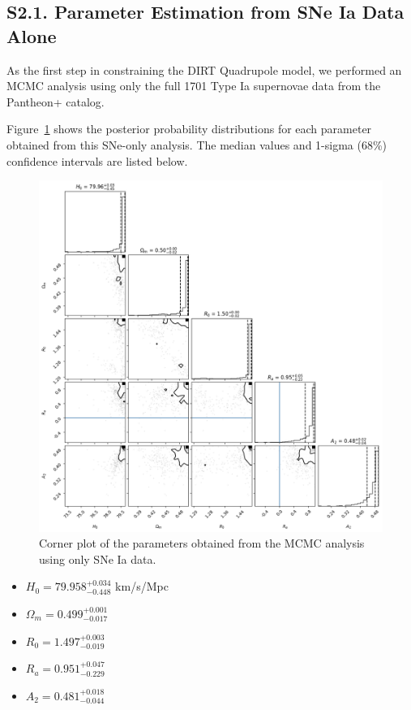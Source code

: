 \documentclass[a4paper,12pt]{article}
\begin{document}
\subsection*{S2.1. Parameter Estimation from SNe Ia Data Alone}
\label{subsec:supp_sne_only_fit}

As the first step in constraining the DIRT Quadrupole model, we performed an MCMC analysis using only the full 1701 Type Ia supernovae data from the Pantheon+ catalog.

Figure~\ref{fig:supp_mcmc_sne_only} shows the posterior probability distributions for each parameter obtained from this SNe-only analysis. The median values and 1-sigma (68\%) confidence intervals are listed below.

\begin{figure}[H]
    \centering
    \includegraphics[width=\linewidth]{S2_MCMC_analysis_of_SNe_Ia_alone.png}
    \caption{Corner plot of the parameters obtained from the MCMC analysis using only SNe Ia data.}
    \label{fig:supp_mcmc_sne_only}
\end{figure}

\begin{itemize}
    \item $H_0 = 79.958 ^{+0.034} _{-0.448}$ km/s/Mpc
    \item $\Omega_m = 0.499 ^{+0.001} _{-0.017}$
    \item $R_0 = 1.497 ^{+0.003} _{-0.019}$
    \item $R_a = 0.951 ^{+0.047} _{-0.229}$
    \item $A_2 = 0.481 ^{+0.018} _{-0.044}$
\end{itemize}
\end{document}
